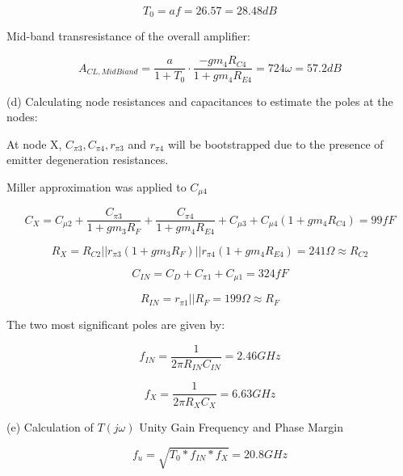 \documentclass[12pt,a4paper]{article}
\begin{document}
\begin{equation}
  T_{0} = a f = 26.57 = 28.48dB
\end{equation}

Mid-band transresistance of the overall amplifier:

\begin{equation}
  A_{CL, MidBiand} = \frac{a}{1 + T_0} \cdot \frac{-gm_4 R_{C4}}{1 + gm_4 R_{E4}} = 724\omega = 57.2dB
\end{equation}

\newpage
(d) Calculating node resistances and capacitances to estimate the poles at the nodes:

At node X, $C_{\pi 3}, C_{\pi 4}, r_{\pi 3}$ and $r_{\pi 4}$ will be bootstrapped due to the presence of emitter degeneration resistances.

Miller approximation was applied to $C_{\mu 4}$

\begin{equation}
  C_X = C_{\mu 2} + \frac{C_{\pi 3}}{1 + gm_3 R_F} + \frac{C_{\pi 4}}{1+gm_4 R_{E4}} + C_{\mu 3} + C_{\mu 4} (1 + gm_4 R_{C4}) = 99fF
\end{equation}

\begin{equation}
  R_X = R_{C2} || r_{\pi 3}(1+gm_3 R_F) || r_{\pi4}(1+gm_4 R_{E4}) = 241\Omega \approx R_{C2}
\end{equation}

\begin{equation}
  C_{IN} = C_D + C_{\pi1} + C_{\mu1} = 324fF
\end{equation}

\begin{equation}
  R_{IN} = r_{\pi1} || R_F = 199\Omega \approx R_F
\end{equation}

The two most significant poles are given by:

\begin{equation}
  f_{IN} = \frac{1}{2 \pi R_{IN} C_{IN}} = 2.46GHz
\end{equation}

\begin{equation}
  f_{X} = \frac{1}{2 \pi R_{X} C_{X}} = 6.63GHz
\end{equation}

\newpage
(e) Calculation of $T(j\omega)$ Unity Gain Frequency and Phase Margin

\begin{equation}
  f_{u} = \sqrt{T_0 * f_{IN} * f_{X}} = 20.8GHz
\end{equation}
\end{document}
